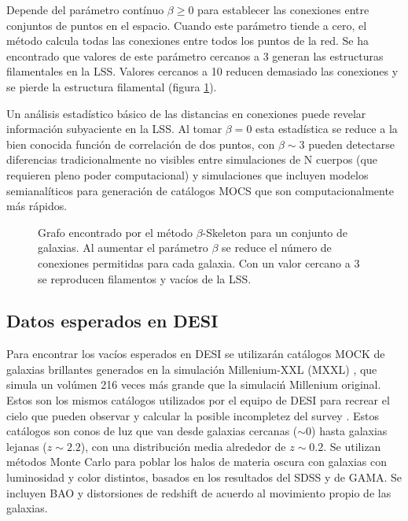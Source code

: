 \documentclass[preprint]{aastex62}
\begin{document}
  Depende del parámetro contínuo $\beta \geq 0$ para establecer las conexiones entre conjuntos de
  puntos en el espacio. Cuando este parámetro tiende a cero, el método calcula todas las conexiones
  entre todos los puntos de la red. Se ha encontrado que valores de este parámetro cercanos a 3
  generan las estructuras filamentales en la LSS. Valores cercanos a 10 reducen demasiado las
  conexiones y se pierde la estructura filamental (figura \ref{fig:beta_skeleton_analysis}). 

  Un análisis estadístico básico de las distancias en conexiones puede revelar información subyaciente
  en la LSS. Al tomar $\beta = 0$ esta estadística se reduce a la bien conocida función de correlación
  de dos puntos, con $\beta \sim 3$ pueden detectarse diferencias tradicionalmente no visibles entre
  simulaciones de N cuerpos (que requieren pleno poder computacional) y simulaciones que incluyen
  modelos semianalíticos para generación de catálogos MOCS que son computacionalmente más rápidos.
  \begin{figure}
    \caption{Grafo encontrado por el método $\beta$-Skeleton para un conjunto de galaxias. Al aumentar el
      parámetro $\beta$ se reduce el número de conexiones permitidas para cada galaxia. Con un valor cercano
      a 3 se reproducen filamentos y vacíos de la LSS.
      \citep{Fang2018} \label{fig:beta_skeleton_analysis}}
  \end{figure}

  \subsection{Datos esperados en DESI}
  Para encontrar los vacíos esperados en DESI se utilizarán catálogos MOCK de galaxias brillantes
  generados en la simulación Millenium-XXL (MXXL) \citep{Smith2017}, que simula un
  volúmen 216 veces más grande que la simulaciń Millenium original. Estos
  son los mismos catálogos utilizados por el equipo de DESI para recrear el cielo que pueden
  observar y calcular la posible incompletez del survey \citep{Smith2018}.
  Estos catálogos son conos de luz que van
  desde galaxias cercanas ($\sim0$) hasta galaxias lejanas ($z\sim2.2$), con una distribución
  media alrededor de $z\sim 0.2$. Se utilizan métodos Monte Carlo para poblar los halos de materia
  oscura con galaxias con luminosidad y color distintos, basados en los resultados del SDSS y de
  GAMA. Se incluyen BAO y distorsiones de redshift de acuerdo al movimiento propio de las galaxias.
  
\end{document}
